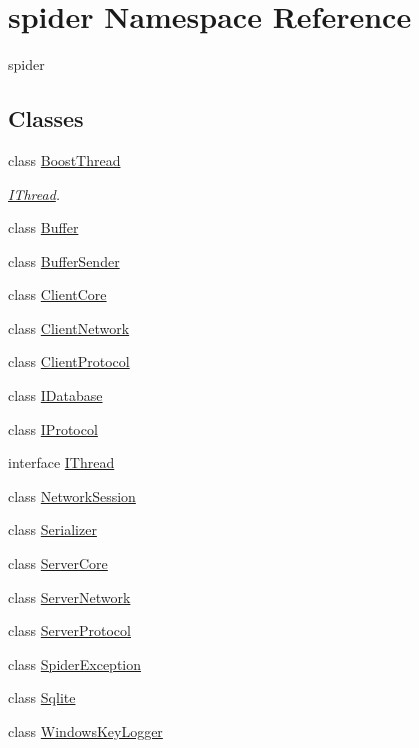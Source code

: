 \hypertarget{namespacespider}{}\section{spider Namespace Reference}
\label{namespacespider}


spider  


\subsection*{Classes}
\begin{DoxyCompactItemize}
\item 
class \hyperlink{classspider_1_1_boost_thread}{Boost\+Thread}
\begin{DoxyCompactList}\small\item\em \hyperlink{classspider_1_1_i_thread}{I\+Thread}. \end{DoxyCompactList}\item 
class \hyperlink{classspider_1_1_buffer}{Buffer}
\item 
class \hyperlink{classspider_1_1_buffer_sender}{Buffer\+Sender}
\item 
class \hyperlink{classspider_1_1_client_core}{Client\+Core}
\item 
class \hyperlink{classspider_1_1_client_network}{Client\+Network}
\item 
class \hyperlink{classspider_1_1_client_protocol}{Client\+Protocol}
\item 
class \hyperlink{classspider_1_1_i_database}{I\+Database}
\item 
class \hyperlink{classspider_1_1_i_protocol}{I\+Protocol}
\item 
interface \hyperlink{classspider_1_1_i_thread}{I\+Thread}
\item 
class \hyperlink{classspider_1_1_network_session}{Network\+Session}
\item 
class \hyperlink{classspider_1_1_serializer}{Serializer}
\item 
class \hyperlink{classspider_1_1_server_core}{Server\+Core}
\item 
class \hyperlink{classspider_1_1_server_network}{Server\+Network}
\item 
class \hyperlink{classspider_1_1_server_protocol}{Server\+Protocol}
\item 
class \hyperlink{classspider_1_1_spider_exception}{Spider\+Exception}
\item 
class \hyperlink{classspider_1_1_sqlite}{Sqlite}
\item 
class \hyperlink{classspider_1_1_windows_key_logger}{Windows\+Key\+Logger}
\end{DoxyCompactItemize}
